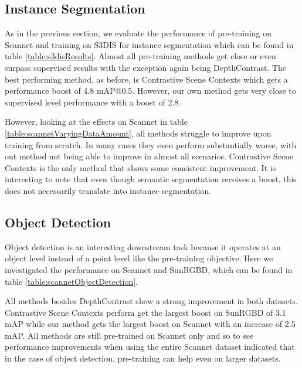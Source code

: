 \documentclass[10pt,twocolumn,letterpaper]{article}
\begin{document}
\subsection{Instance Segmentation}
\label{sec:results:instance}

As in the previous section, we evaluate the performance of pre-training on Scannet and training on S3DIS for instance segmentation which can be found in table \ref{table:s3disResults}. Almost all pre-training methods get close or even surpass supervised results with the exception again being DepthContrast. The best performing method, as before, is Contrastive Scene Contexts which gets a performance boost of 4.8 mAP@0.5. However, our own method gets very close to supervised level performance with a boost of 2.8.

However, looking at the effects on Scannet in table \ref{table:scannetVaryingDataAmount}, all methods struggle to improve upon training from scratch. In many cases they even perform substantially worse, with out method not being able to improve in almost all scenarios. Contrastive Scene Contexts is the only method that shows some consistent improvement. It is interesting to note that even though semantic segmentation receives a boost, this does not necessarily translate into instance segmentation.

\subsection{Object Detection}
\label{sec:results:object}

Object detection is an interesting downstream task because it operates at an object level instead of a point level like the pre-training objective. Here we investigated the performance on Scannet and SunRGBD, which can be found in table \ref{table:scannetObjectDetection}.

All methods besides DepthContrast show a strong improvement in both datasets. Contrastive Scene Contexts perform get the largest boost on SunRGBD of 3.1 mAP while our method gets the largest boost on Scannet with an increase of 2.5 mAP. All methods are still pre-trained on Scannet only and so to see performance improvements when using the entire Scannet dataset indicated that in the case of object detection, pre-training can help even on larger datasets.
\end{document}
